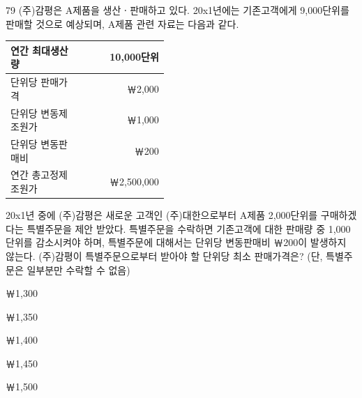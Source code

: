 \begin{question}{79}
(주)감평은 A제품을 생산ㆍ판매하고 있다. 20x1년에는 기존고객에게 9,000단위를 판매할 것으로 예상되며, A제품 관련 자료는 다음과 같다.
\par{\small\centering\begin{tabular}{|p{0.45\linewidth}|r|}
\hline
연간 최대생산량 & 10,000단위 \\ \hline
단위당 판매가격 & ￦2,000 \\ \hline
단위당 변동제조원가 & ￦1,000 \\ \hline
단위당 변동판매비 & ￦200 \\ \hline
연간 총고정제조원가 & ￦2,500,000 \\ \hline
\end{tabular}\par}
20x1년 중에 (주)감평은 새로운 고객인 (주)대한으로부터 A제품 2,000단위를 구매하겠다는 특별주문을 제안 받았다. 특별주문을 수락하면 기존고객에 대한 판매량 중 1,000단위를 감소시켜야 하며, 특별주문에 대해서는 단위당 변동판매비 ￦200이 발생하지 않는다. (주)감평이 특별주문으로부터 받아야 할 단위당 최소 판매가격은? (단, 특별주문은 일부분만 수락할 수 없음) \par
\begin{choices}
  \item ￦1,300
  \item ￦1,350
  \item ￦1,400
  \item ￦1,450
  \item ￦1,500
\end{choices}
\end{question}
